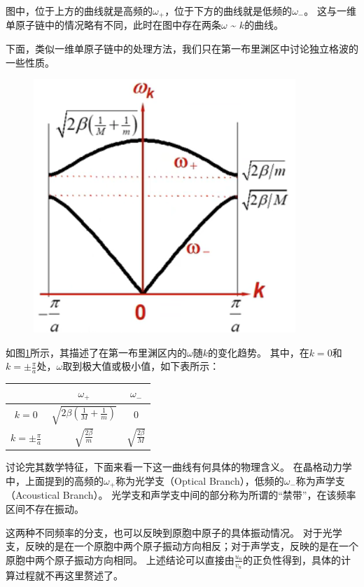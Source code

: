 \documentclass[declarePage]{ecnuthesis}
\begin{document}
图中，位于上方的曲线就是高频的$\omega_+$，位于下方的曲线就是低频的$\omega_-$。%
这与一维单原子链中的情况略有不同，此时在图中存在两条$\omega$ \~{} $k$的曲线。

下面，类似一维单原子链中的处理方法，我们只在第一布里渊区中讨论独立格波的一些性质。
\begin{figure}[htb]
    \centering
    \includegraphics[width=.33\textwidth]{1DDCDR1.png}
     \label{1DDCDR1}
\end{figure}

如图\ref{1DDCDR1}所示，其描述了在第一布里渊区内的$\omega$随$k$的变化趋势。%
其中，在$k=0$和$k=\pm\frac{\pi}{a}$处，$\omega$取到极大值或极小值，如下表所示：
\begin{table}[htb]
    \centering
    \label{DRT}
    \begin{tabular}{|c|c|c|}
        \hline
                             & $\omega_+$                               & $\omega_-$                \\ 
        \hline
        $k=0$                & $\sqrt{2\beta(\frac{1}{M}+\frac{1}{m})}$ & $0$                       \\ 
        \hline
        $k=\pm\frac{\pi}{a}$ & $\sqrt{\frac{2\beta}{m}}$                & $\sqrt{\frac{2\beta}{M}}$ \\ 
        \hline
    \end{tabular}
\end{table}

讨论完其数学特征，下面来看一下这一曲线有何具体的物理含义。%
在晶格动力学中，上面提到的高频的$\omega_+$称为光学支（Optical Branch），低频的$\omega_-$称为声学支（Acoustical Branch）。%
光学支和声学支中间的部分称为所谓的“禁带”，在该频率区间不存在振动。

这两种不同频率的分支，也可以反映到原胞中原子的具体振动情况。%
对于光学支，反映的是在一个原胞中两个原子振动方向相反；对于声学支，反映的是在一个原胞中两个原子振动方向相同。%
上述结论可以直接由$\frac{u_n}{v_n}$的正负性得到，具体的计算过程就不再这里赘述了。
\end{document}

